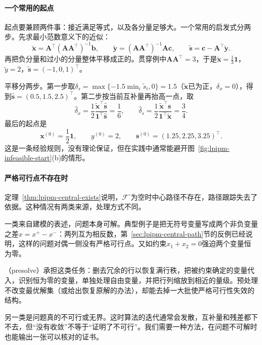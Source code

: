 \paragraph{一个常用的起点}
起点要兼顾两件事：接近满足等式，以及各分量足够大。一个常用的启发式分两步。先求最小范数意义下的近似：
\begin{equation}
 \tilde{\bm{x}}=\bm{A}^\top(\bm{A}\bm{A}^\top)^{-1}\bm{b},\qquad
 \tilde{\bm{y}}=(\bm{A}\bm{A}^\top)^{-1}\bm{A}\bm{c},\qquad
 \tilde{\bm{s}}=\bm{c}-\bm{A}^\top\tilde{\bm{y}}.
 \label{eq:lpipm-mehrotra-start}
\end{equation}
再把负分量和过小的分量整体平移成正的。贯穿例中$\bm{A}\bm{A}^\top=3$，于是$\tilde{\bm{x}}=\tfrac13\bm{1}$，$\tilde{y}=2$，$\tilde{\bm{s}}=(-1,0,1)^\top$。

平移分两步。第一步取$\delta_s=\max\{-1.5\min_i\tilde{s}_i,0\}=1.5$（$\tilde{\bm{x}}$已为正，$\delta_x=0$），得到$\hat{\bm{s}}=(0.5,1.5,2.5)^\top$。第二步按当前互补量再抬高一点，取
\[
 \hat{\delta}_x=\frac12\frac{\tilde{\bm{x}}^\top\hat{\bm{s}}}{\bm{1}^\top\hat{\bm{s}}}=\frac16,\qquad
 \hat{\delta}_s=\frac12\frac{\tilde{\bm{x}}^\top\hat{\bm{s}}}{\bm{1}^\top\tilde{\bm{x}}}=\frac34.
\]
最后的起点是
\[
 \bm{x}^{(0)}=\frac12\bm{1},\qquad y^{(0)}=2,\qquad\bm{s}^{(0)}=(1.25,2.25,3.25)^\top.
\]
这是一条经验规则，没有理论保证，但在实践中通常能避开图~\ref{fig:lpipm-infeasible-start}(b)的情形。

\paragraph{严格可行点不存在时}
定理~\ref{thm:lpipm-central-exists}说明，$\mathcal{F}^{\circ}$为空时中心路径不存在，路径跟踪失去了依据。这种情况有两类来源，处理方式不同。

一类来自建模的表述，问题本身可解。典型例子是把无符号变量写成两个非负变量之差$x=x^+-x^-$：两列互为相反数，第~\ref{sec:lpipm-central-path}节的反例已经说明，这样的问题对偶一侧没有严格可行点。又如约束$x_1+x_2=0$强迫两个变量恒为零。

（presolve）承担这类任务：删去冗余的行以恢复满行秩，把被约束确定的变量代入，识别恒为零的变量，单独处理自由变量，并把行列缩放到相近的量级。预处理不改变最优解集（或给出恢复原解的办法），却能去掉一大批使严格可行性失效的结构。

另一类是问题真的不可行或无界。这时算法的迭代通常会发散，互补量和残差都下不去，但“没有收敛”不等于“证明了不可行”。我们需要一种方法，在问题不可解时也能输出一张可以核对的证书。

